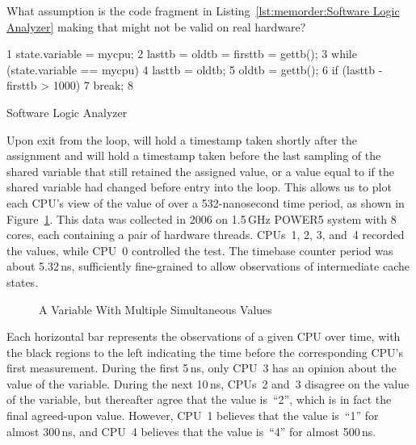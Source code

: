 \QuickQuiz{}
	What assumption is the code fragment
	in Listing~\ref{lst:memorder:Software Logic Analyzer}
	making that might not be valid on real hardware?
 \QuickQuizEnd

\begin{listing}[tbp]
{ \scriptsize
\begin{verbbox}
  1 state.variable = mycpu;
  2 lasttb = oldtb = firsttb = gettb();
  3 while (state.variable == mycpu) {
  4   lasttb = oldtb;
  5   oldtb = gettb();
  6   if (lasttb - firsttb > 1000)
  7     break;
  8 }
\end{verbbox}
}
\centering
\theverbbox
\caption{Software Logic Analyzer}
\label{lst:memorder:Software Logic Analyzer}
\end{listing}

Upon exit from the loop,  will hold a timestamp
taken shortly after the assignment and  will hold
a timestamp taken before the last sampling of the shared variable
that still retained the assigned value, or a value equal to 
if the shared variable had changed before entry into the loop.
This allows us to plot each CPU's view of the value of 
over a 532-nanosecond time period, as shown in
Figure~\ref{fig:memorder:A Variable With Multiple Simultaneous Values}.
This data was collected in 2006 on 1.5\,GHz POWER5 system with 8 cores,
each containing a pair of hardware threads.
CPUs~1, 2, 3, and~4 recorded the values, while CPU~0 controlled the test.
The timebase counter period was about 5.32\,ns, sufficiently fine-grained
to allow observations of intermediate cache states.

\begin{figure}[htb]
\centering
{}
\caption{A Variable With Multiple Simultaneous Values}
\label{fig:memorder:A Variable With Multiple Simultaneous Values}
\end{figure}

Each horizontal bar represents the observations of a given CPU over time,
with the black regions to the left indicating the time before the
corresponding CPU's first measurement.
During the first 5\,ns, only CPU~3 has an opinion about the value of the
variable.
During the next 10\,ns, CPUs~2 and~3 disagree on the value of the variable,
but thereafter agree that the value is~``2'', which is in fact
the final agreed-upon value.
However, CPU~1 believes that the value is~``1'' for almost 300\,ns, and
CPU~4 believes that the value is~``4'' for almost 500\,ns.

